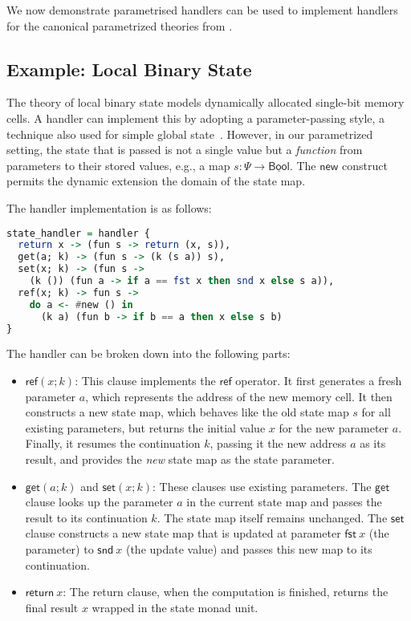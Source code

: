 \documentclass{article}
\theoremstyle{definition}
\theoremstyle{remark}
\newcommand\new{\mathsf{new}}
\newcommand\bool{\mathsf{Bool}}
\newcommand\comp[1]{\underline{#1}}
\newcommand\ret[1]{{\mathsf{return} \ #1}}
\newcommand\get{\mathsf{get}}
\newcommand\set{\mathsf{set}}
\newcommand\newref{\mathsf{ref}}
\newcommand\fst[1]{{\mathsf{fst} \ #1}}
\newcommand\snd[1]{{\mathsf{snd} \ #1}}
\begin{document}
We now demonstrate parametrised handlers can be used to implement handlers for the canonical parametrized theories from .

\subsection{Example: Local Binary State}

The theory of local binary state models dynamically allocated single-bit memory cells.
A handler can implement this by adopting a parameter-passing style, a technique also used for simple global state~\cite{pretnar_introduction_2015}.
However, in our parametrized setting, the state that is passed is not a single value but a \emph{function} from parameters to their stored values,
e.g., a map $s: \Psi \rightarrow \comp \bool$. The $\new$ construct permits the dynamic extension the domain of the state map.

The handler implementation is as follows:

\begin{lstlisting}[language=Haskell, basicstyle=\small\ttfamily]
state_handler = handler {
  return x -> (fun s -> return (x, s)),
  get(a; k) -> (fun s -> (k (s a)) s),
  set(x; k) -> (fun s ->
    (k ()) (fun a -> if a == fst x then snd x else s a)),
  ref(x; k) -> fun s ->
    do a <- #new () in
      (k a) (fun b -> if b == a then x else s b)
}
\end{lstlisting}

The handler can be broken down into the following parts:
\begin{itemize}
    \item $\newref(x; k)$: This clause implements the $\newref$ operator.
      It first generates a fresh parameter $a$, which represents the address of the new memory cell.
      It then constructs a new state map, which behaves like the old state map $s$ for all existing parameters, but returns the initial value $x$ for the new parameter $a$.
      Finally, it resumes the continuation $k$, passing it the new address $a$ as its result, and provides the \emph{new} state map as the state parameter.
    \item $\get(a; k)$ and $\set(x; k)$: These clauses use existing parameters.
      The $\get$ clause looks up the parameter $a$ in the current state map and passes the result to its continuation $k$. The state map itself remains unchanged.
      The $\set$ clause constructs a new state map that is updated at parameter $\fst x$ (the parameter) to $\snd x$ (the update value) and passes this new map to its continuation.
    \item $\ret{x}$: The return clause, when the computation is finished, returns the final result $x$ wrapped in the state monad unit.
\end{itemize}
\end{document}
